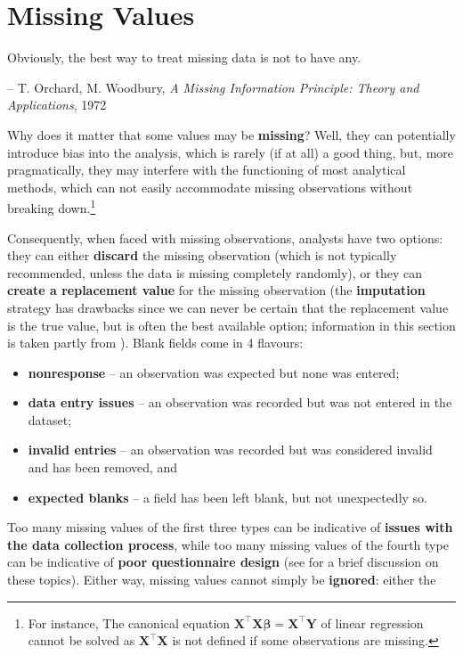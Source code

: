 \section{Missing Values}    
\begin{tcolorbox}[title=Easier Said Than Done]
Obviously, the best way to treat missing data is not to have any. \\[-0.6cm]
\begin{flushright}
-- T. Orchard, M. Woodbury, \textit{A Missing Information Principle: Theory and Applications}, 1972
\end{flushright}
\end{tcolorbox}
\noindent Why does it matter that some values may be \textbf{missing}? Well, they can potentially introduce bias into the analysis, which is rarely (if at all) a good thing, but, more pragmatically, they may interfere with the functioning of most analytical methods, which can not easily accommodate missing observations without breaking down.\footnote{For instance, The canonical equation $\mathbf{X}^{\!\top}\mathbf{X}\mathbf{\beta}=\mathbf{X}^{\!\top}\mathbf{Y}$ of linear regression cannot be solved as $\mathbf{X}^{\!\top}\mathbf{X}$ is not defined if some observations are missing.}  \par Consequently, when faced with missing observations, analysts have two options: they can either \textbf{discard} the missing observation (which is not typically recommended, unless the data is missing completely randomly), or they can \textbf{create a replacement value} for the missing observation (the \textbf{imputation} strategy has drawbacks since we can never be certain that the replacement value is the true value, but is often the best available option; information in this section is taken partly from \cite{DP_Shinnie,DP_RLVHS,DP_vB,DP_R}).
\newpage\noindent  Blank fields come in 4 flavours: \begin{itemize}[noitemsep]\item \textbf{nonresponse} -- an observation was expected but none was entered; \item  \textbf{data entry issues} -- an observation was recorded but was not entered in the dataset; \item \textbf{invalid entries} -- an observation was recorded but was considered invalid and has been removed, and \item  \textbf{expected blanks} -- a field has been left blank, but not unexpectedly so.
\end{itemize}
Too many missing values of the first three types can be indicative of \textbf{issues with the data collection process}, while too many missing values of the fourth type can be indicative of \textbf{poor questionnaire design} (see \cite{DP_PDC} for a brief discussion on these topics). \newl Either way, missing values cannot simply be \textbf{ignored}: either the
